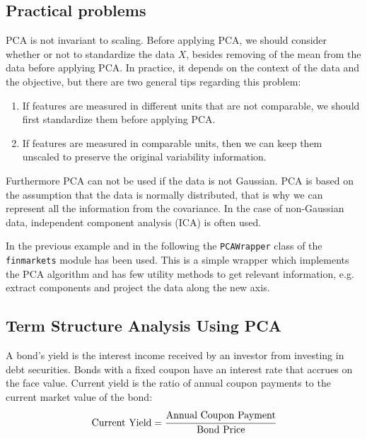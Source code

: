 \subsection{Practical problems}
PCA is not invariant to scaling. Before applying PCA, we should consider whether or not to standardize the data $X$, besides removing of the mean from the data before applying PCA. In practice, it depends on the context of the data and the objective, but there are two general tips regarding this problem:
\begin{enumerate}
	\item If features are measured in different units that are not comparable, we should first standardize them before applying PCA.
	\item If features are measured in comparable units, then we can keep them unscaled to preserve the original variability information.
\end{enumerate}

Furthermore PCA can not be used if the data is not Gaussian. PCA is based on the assumption that the data is normally distributed, that is why we can represent all the information from the covariance. In the case of non-Gaussian data, independent component analysis (ICA) is often used.

\begin{finmarkets}
In the previous example and in the following the \texttt{PCAWrapper} class of the \texttt{finmarkets} module has been used. 
This is a simple wrapper which implements the PCA algorithm and has few utility methods to get relevant information, e.g. extract components and project the data along the new axis.
\end{finmarkets}


\subsection{Term Structure Analysis Using PCA}

A bond’s yield is the interest income received by an investor from investing in debt securities. Bonds with a fixed coupon have an interest rate that accrues on the face value.
Current yield is the ratio of annual coupon payments to the current market value of the bond:
\begin{equation}
\text{Current Yield} = \cfrac{\text{Annual Coupon Payment}}{\text{Bond Price}}
\end{equation}

